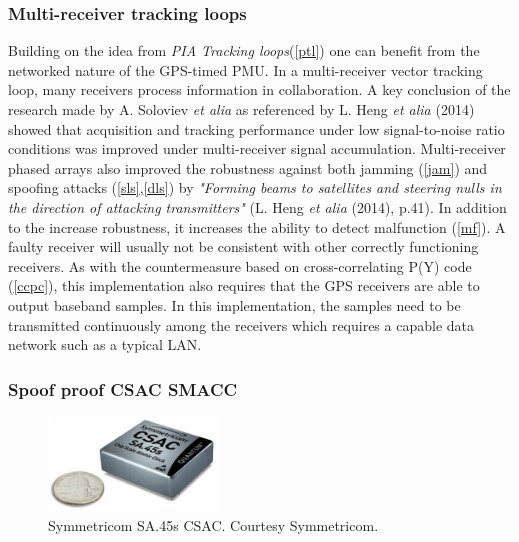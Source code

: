 \documentclass[12pt,english,a4paper]{article}
\begin{document}
\subsubsection{Multi-receiver tracking loops}\label{mrtl}
Building on the idea from \textit{PIA Tracking loops}(\ref{ptl}) one can benefit from the networked nature of the GPS-timed PMU. In a multi-receiver vector tracking loop, many receivers process information in collaboration. A key conclusion of the research made by A. Soloviev \textit{et alia} as referenced by L. Heng \textit{et alia} (2014) showed that acquisition and tracking performance under low signal-to-noise ratio conditions was improved under multi-receiver signal accumulation. Multi-receiver phased arrays also improved the robustness against both jamming (\ref{jam}) and spoofing attacks (\ref{sls},\ref{dls}) by \textit{"Forming beams to satellites and steering nulls in the direction of attacking transmitters"} (L. Heng \textit{et alia} (2014), p.41). In addition to the increase robustness, it increases the ability to detect malfunction (\ref{mf}). A faulty receiver will usually not be consistent with other correctly functioning receivers. As with the countermeasure based on cross-correlating P(Y) code (\ref{ccpc}), this implementation also requires that the GPS receivers are able to output baseband samples. In this implementation, the samples need to be transmitted continuously among the receivers which requires a capable data network such as a typical LAN. \cite{HengChouGao14}  

\subsubsection{Spoof proof CSAC SMACC}\label{op}
\begin{figure}
  \centering
  \includegraphics[width=0.40\textwidth]{csac.jpg}
  \caption[Symmetricom SA.45s CSAC]
   {Symmetricom SA.45s CSAC. Courtesy Symmetricom.}
\end{figure} 
\end{document}
